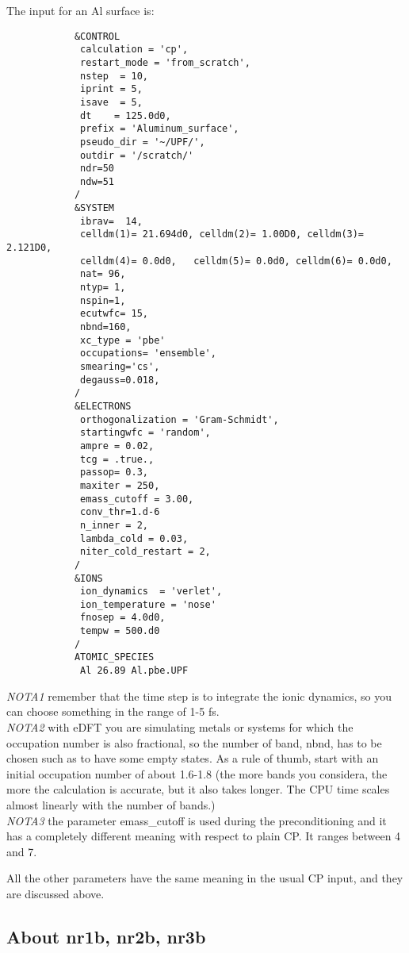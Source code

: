 \documentclass[12pt,a4paper]{article}
\begin{document}
The input for an Al surface is:
\begin{verbatim}
            &CONTROL
             calculation = 'cp',
             restart_mode = 'from_scratch',
             nstep  = 10,
             iprint = 5,
             isave  = 5,
             dt    = 125.0d0,
             prefix = 'Aluminum_surface',
             pseudo_dir = '~/UPF/',
             outdir = '/scratch/'
             ndr=50
             ndw=51
            /
            &SYSTEM
             ibrav=  14,
             celldm(1)= 21.694d0, celldm(2)= 1.00D0, celldm(3)= 2.121D0,
             celldm(4)= 0.0d0,   celldm(5)= 0.0d0, celldm(6)= 0.0d0,
             nat= 96,
             ntyp= 1,
             nspin=1,
             ecutwfc= 15,
             nbnd=160,
             xc_type = 'pbe'
             occupations= 'ensemble',
             smearing='cs',
             degauss=0.018,
            /
            &ELECTRONS
             orthogonalization = 'Gram-Schmidt',
             startingwfc = 'random',
             ampre = 0.02,
             tcg = .true.,
             passop= 0.3,
             maxiter = 250,
             emass_cutoff = 3.00,
             conv_thr=1.d-6
             n_inner = 2,
             lambda_cold = 0.03,
             niter_cold_restart = 2,
            /
            &IONS
             ion_dynamics  = 'verlet',
             ion_temperature = 'nose'
             fnosep = 4.0d0,
             tempw = 500.d0
            /
            ATOMIC_SPECIES
             Al 26.89 Al.pbe.UPF
\end{verbatim}
{\em NOTA1}  remember that the time step is to integrate the ionic dynamics,
so you can choose something in the range of 1-5 fs. \\
{\em NOTA2} with eDFT you are simulating metals or systems for which the 
occupation number is also fractional, so the number of band, nbnd, has to 
be chosen such as to have some empty states. As a rule of thumb, start
with an initial occupation number of about 1.6-1.8 (the more bands you 
considera, the more the calculation is accurate, but it also takes longer.
The CPU time scales almost linearly with the number of bands.) \\
{\em NOTA3} the parameter emass\_cutoff is used during the preconditioning 
and it has a completely different meaning with respect to plain CP. 
It ranges between 4 and 7.

All the other parameters have the same meaning in the usual CP input, 
and they are discussed above.

\subsection{ About nr1b, nr2b, nr3b}
\end{document}

